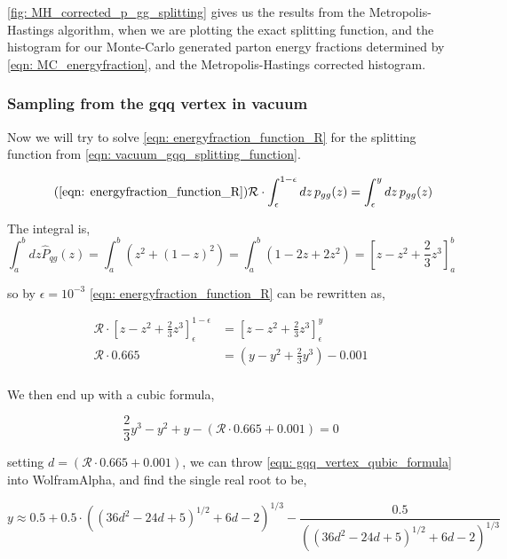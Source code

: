 \documentclass[main.tex]{subfiles}
\begin{document}
\autoref{fig: MH_corrected_p_gg_splitting} gives us the results from the Metropolis-Hastings algorithm, when we are plotting the exact splitting function, and the histogram for our Monte-Carlo generated parton energy fractions determined by \autoref{eqn: MC_energyfraction}, and the Metropolis-Hastings corrected histogram.

\subsubsection{Sampling from the gqq vertex in vacuum}
Now we will try to solve \autoref{eqn: energyfraction_function_R} for the \gqq splitting function from \autoref{eqn: vacuum_gqq_splitting_function}. 

\begin{equation}\tag{\ref{eqn: energyfraction_function_R}}
    \mathcal{R} \cdot \int_\epsilon^{1-\epsilon} dz \, p_{gg}(z) = \int_\epsilon^{y}dz \, p_{gg}(z)
\end{equation}

The integral is, 
\begin{equation}
    \int_a^b dz\hat{P}_{qg}(z) = \int_a^b \left(z^2 + (1-z)^2 \right) = \int_a^b \left(1-2z+2z^2 \right) = \left[ z - z^2 + \frac{2}{3} z^3 \right]_a^b
\end{equation}

so by \(\epsilon = 10^{-3}\) \autoref{eqn: energyfraction_function_R} can be rewritten as,

\begin{align}
    \mathcal{R} \cdot \left[ z - z^2 + \frac{2}{3} z^3 \right]_\epsilon^{1-\epsilon} &= \left[ z - z^2 + \frac{2}{3} z^3 \right]_\epsilon^{y} \nonumber\\
    \mathcal{R} \cdot 0.665 &= (y - y^2 + \frac{2}{3} y^3) - 0.001 \\
\end{align}

We then end up with a cubic formula, 

\begin{equation}\label{eqn: gqq_vertex_qubic_formula}
    \frac{2}{3} y^3 - y^2 + y - (\mathcal{R} \cdot 0.665+0.001) = 0
\end{equation}

setting \(d = (\mathcal{R} \cdot 0.665+0.001) \), we can throw \autoref{eqn: gqq_vertex_qubic_formula} into WolframAlpha, and find the single real root to be,

\begin{equation}\label{eqn: gqq_vacuum_sample}
    y \approx 0.5 + 0.5 \cdot((36 d^2 - 24 d + 5)^{1/2} + 6 d - 2)^{1/3} - \frac{0.5}{((36 d^2 - 24 d + 5)^{1/2} + 6 d - 2)^{1/3}}
\end{equation}
\end{document}
